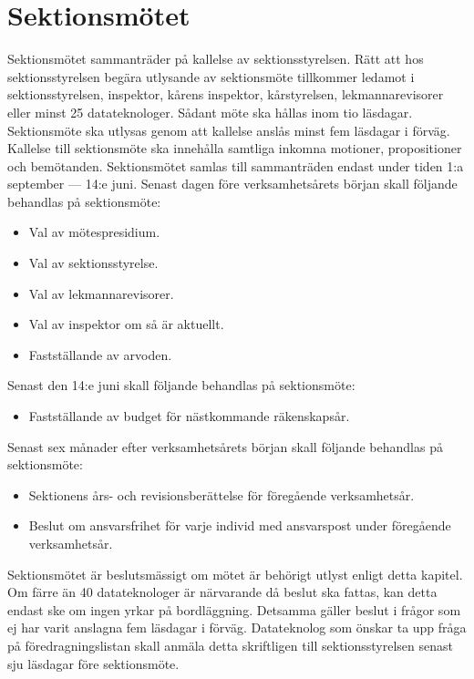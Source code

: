 \documentclass[a4paper]{dteklag}
\begin{document}
\section{Sektionsmötet}
\para[Sammanträden] Sektionsmötet sammanträder på kallelse av sektionsstyrelsen.
\para Rätt att hos sektionsstyrelsen begära utlysande av sektionsmöte tillkommer ledamot i sektionsstyrelsen, inspektor, kårens inspektor, kårstyrelsen, lekmannarevisorer eller minst 25 datateknologer. Sådant möte ska hållas inom tio läsdagar.
\para Sektionsmöte ska utlysas genom att kallelse anslås minst fem läsdagar i förväg.
\para Kallelse till sektionsmöte ska innehålla samtliga inkomna motioner, propositioner och bemötanden.
\para Sektionsmötet samlas till sammanträden endast under tiden 1:a september — 14:e juni.
\para[Årsmöte] Senast dagen före verksamhetsårets början skall följande behandlas på sektionsmöte:
\begin{itemize}
\item Val av mötespresidium.
\item Val av sektionsstyrelse.
\item Val av lekmannarevisorer.
\item Val av inspektor om så är aktuellt.
\item Fastställande av arvoden.
\end{itemize}
\para[Vårmöte] Senast den 14:e juni skall följande behandlas på sektionsmöte:
\begin{itemize}
\item Fastställande av budget för nästkommande räkenskapsår.
\end{itemize}
\para [Dechargemöte] Senast sex månader efter verksamhetsårets början skall följande behandlas på sektionsmöte:
\begin{itemize}
\item Sektionens års- och revisionsberättelse för föregående verksamhetsår.
\item Beslut om ansvarsfrihet för varje individ med ansvarspost under föregående verksamhetsår.
\end{itemize}
\para[Beslutförhet] Sektionsmötet är beslutsmässigt om mötet är behörigt utlyst enligt detta kapitel.
\stycke
Om färre än 40 datateknologer är närvarande då beslut ska fattas, kan detta endast ske om ingen yrkar på bordläggning.
\stycke Detsamma gäller beslut i frågor som ej har varit anslagna fem läsdagar i förväg.
\para[Motion] Datateknolog som önskar ta upp fråga på föredragningslistan skall anmäla detta skriftligen till sektionsstyrelsen senast sju läsdagar före sektionsmöte.
\end{document}
